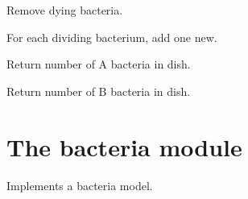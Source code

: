 \documentclass[a4paper,10pt,english]{sphinxmanual}
\begin{document}
\begin{fulllineitems}
\begin{fulllineitems}
\label{\detokenize{dish_and_bacteria:biolab.dish.Dish.death}}
Remove dying bacteria.

\end{fulllineitems}


\begin{fulllineitems}
\label{\detokenize{dish_and_bacteria:biolab.dish.Dish.division}}
For each dividing bacterium, add one new.

\end{fulllineitems}


\begin{fulllineitems}
\label{\detokenize{dish_and_bacteria:biolab.dish.Dish.get_num_a}}
Return number of A bacteria in dish.

\end{fulllineitems}


\begin{fulllineitems}
\label{\detokenize{dish_and_bacteria:biolab.dish.Dish.get_num_b}}
Return number of B bacteria in dish.

\end{fulllineitems}


\end{fulllineitems}



\section{The bacteria module}
\label{\detokenize{dish_and_bacteria:module-biolab.bacteria}}\label{\detokenize{dish_and_bacteria:the-bacteria-module}}
Implements a bacteria model.
\end{document}
